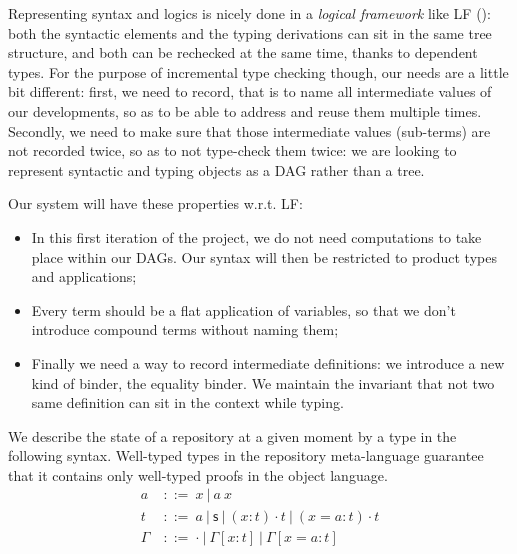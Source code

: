 \documentclass{article}
\newcommand{\sort}{\textsf{s}}
\newcommand{\gor}{\ |\ }
\newcommand{\gdecl}[2]{{#1}\ &::=\ {#2}}
\begin{document}
Representing syntax and logics is nicely done in a \emph{logical
  framework} like LF (\cite{harper1993framework}): both the syntactic
elements and the typing derivations can sit in the same tree
structure, and both can be rechecked at the same time, thanks to
dependent types. For the purpose of incremental type checking though,
our needs are a little bit different: first, we need to record, that
is to name all intermediate values of our developments, so as to be
able to address and reuse them multiple times. Secondly, we need to
make sure that those intermediate values (sub-terms) are not recorded
twice, so as to not type-check them twice: we are looking to represent
syntactic and typing objects as a DAG rather than a tree.

Our system will have these properties w.r.t. LF:
\begin{itemize}
\item In this first iteration of the project, we do not need
  computations to take place within our DAGs. Our syntax will then be
  restricted to product types and applications;
\item Every term should be a flat application of variables, so that we
  don't introduce compound terms without naming them;
\item Finally we need a way to record intermediate definitions: we
  introduce a new kind of binder, the equality binder. We maintain the
  invariant that not two same definition can sit in the context while
  typing.
\end{itemize}

We describe the state of a repository at a given moment by a type in
the following syntax. Well-typed types in the repository meta-language
guarantee that it contains only well-typed proofs in the object
language.
\begin{align*}
 \gdecl{a}{x \gor a\ x } \\
 \gdecl{t}{a \gor \sort \gor (x:t)\cdot t \gor (x=a:t)\cdot t} \\
 \gdecl{\Gamma}{\cdot \gor \Gamma[x:t] \gor \Gamma[x=a:t]}
\end{align*}


\end{document}
